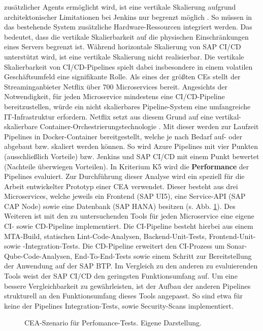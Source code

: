 zusätzlicher Agents ermöglicht wird, ist eine vertikale Skalierung aufgrund architektonischer Limitationen bei Jenkins nur begrenzt möglich \cite{.20230410b}. So müssen in das bestehende System zusätzliche Hardware-Ressourcen integriert werden. Das bedeutet, dass die vertikale Skalierbarkeit auf die physischen Einschränkungen eines Servers begrenzt ist. Während horizontale Skalierung von SAP CI/CD unterstützt wird, ist eine vertikale Skalierung nicht realisierbar. Die vertikale Skalierbarkeit von CI/CD-Pipelines spielt dabei insbesondere in einem volatilen Geschäftsumfeld eine signifikante Rolle. Als eines der größten CEs stellt der Streaminganbieter Netflix über 700 Microservices bereit. Angesichts der Notwendigkeit, für jeden Microservice mindestens eine CI/CD-Pipeline bereitzustellen, würde ein nicht skalierbares Pipeline-System eine umfangreiche IT-Infrastruktur erfordern. Netflix setzt aus diesem Grund auf eine vertikal-skalierbare Container-Orchestrierungstechnologie \cite{Blog.20170419}. Mit dieser werden zur Laufzeit Pipelines in Docker-Container bereitgestellt, welche je nach Bedarf auf- oder abgebaut bzw. skaliert werden können. So wird Azure Pipelines mit vier Punkten (ausschließlich Vorteile) bzw. Jenkins und SAP CI/CD mit einem Punkt bewertet (Nachteile überwiegen Vorteilen). In Kriterium K5 wird die \textbf{Performance} der Pipelines evaluiert. Zur Durchführung dieser Analyse wird ein speziell für die Arbeit entwickelter Prototyp einer CEA verwendet. Dieser besteht aus drei Microservices, welche jeweils ein Frontend (SAP UI5), eine Service-API (SAP CAP Node) sowie eine Datenbank (SAP HANA) besitzen (s. Abb. \ref{fig:Szenario}). Des Weiteren ist mit den zu untersuchenden Tools für jeden Microservice eine eigene CI- sowie CD-Pipeline implementiert. Die CI-Pipeline besteht hierbei aus einem MTA-Build, statischen Lint-Code-Analysen, Backend-Unit-Tests, Frontend-Unit- sowie -Integration-Tests. Die CD-Pipeline erweitert den CI-Prozess um Sonar-Qube-Code-Analysen, End-To-End-Tests sowie einem Schritt zur Bereitstellung der Anwendung auf der SAP BTP. Im Vergleich zu den anderen zu evaluierenden Tools weist der SAP CI/CD den geringsten Funktionsumfang auf. Um eine bessere Vergleichbarkeit zu gewährleisten, ist der Aufbau der anderen Pipelines strukturell an den Funktionsumfang dieses Tools angepasst. So sind etwa für keine der Pipelines Integration-Tests, sowie Security-Scans implementiert. 
\begin{center}
	\begin{figure}[H]
		\centering
		\caption[CEA-Szenario für Perfomance-Tests]{CEA-Szenario für Perfomance-Tests. Eigene Darstellung.}
		\label{fig:Szenario}
	\end{figure}
\end{center}
